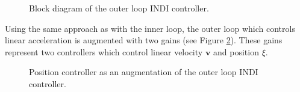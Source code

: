 \documentclass[11pt, a4paper, twoside]{report}
\begin{document}
\begin{figure}[H]
	\centering 
	\captionsetup{justification=centering, singlelinecheck=off, font=bf, belowskip=-0.5cm}
	\caption[Block diagram of the outer loop \acrshort{INDI} controller.]{Block diagram of the outer loop \acrshort{INDI} controller.}
	\label{fig:indi_outer_croped}
\end{figure}
Using the same approach as with the inner loop, the outer loop which controls linear acceleration is augmented with two gains (see Figure \ref{fig:pid_outer_croped}). These gains represent two controllers which control linear velocity $\bm{v}$ and position $\xi$. 
\begin{figure}[H]
	\centering 
	\captionsetup{justification=centering, singlelinecheck=off, font=bf, belowskip=-0.5cm}
	\caption[Position controller as an augmentation of the outer loop \acrshort{INDI} controller]{Position controller as an augmentation of the outer loop \acrshort{INDI} controller.}
	\label{fig:pid_outer_croped}
\end{figure}
\end{document}

